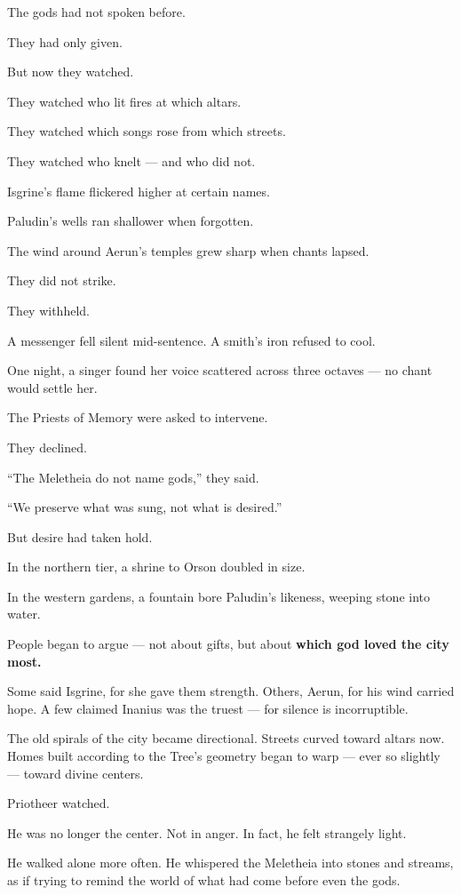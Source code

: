 \documentclass[12pt]{article}
\begin{document}
The gods had not spoken before.

They had only given.

But now they watched.

They watched who lit fires at which altars.  

They watched which songs rose from which streets.  

They watched who knelt — and who did not.

Isgrine’s flame flickered higher at certain names.  

Paludin’s wells ran shallower when forgotten. 

The wind around Aerun’s temples grew sharp when chants lapsed.

They did not strike.  

They withheld.

A messenger fell silent mid-sentence.  
A smith’s iron refused to cool.  

One night, a singer found her voice scattered across three octaves — no chant would settle her.

The Priests of Memory were asked to intervene. 

They declined.  

 “The Meletheia do not name gods,” they said. 
 
 “We preserve what was sung, not what is desired.”

But desire had taken hold.

In the northern tier, a shrine to Orson doubled in size.  

In the western gardens, a fountain bore Paludin’s likeness, weeping stone into water.

People began to argue — not about gifts,  
but about \textbf{which god loved the city most.}

Some said Isgrine, for she gave them strength.  
Others, Aerun, for his wind carried hope.  
A few claimed Inanius was the truest — for silence is incorruptible.

The old spirals of the city became directional.  
Streets curved toward altars now.  
Homes built according to the Tree’s geometry began to warp — ever so slightly — toward divine centers.

Priotheer watched.

He was no longer the center.  
Not in anger.  
In fact, he felt strangely light.

He walked alone more often.  
He whispered the Meletheia into stones and streams,  
as if trying to remind the world of what had come before even the gods.
\end{document}
